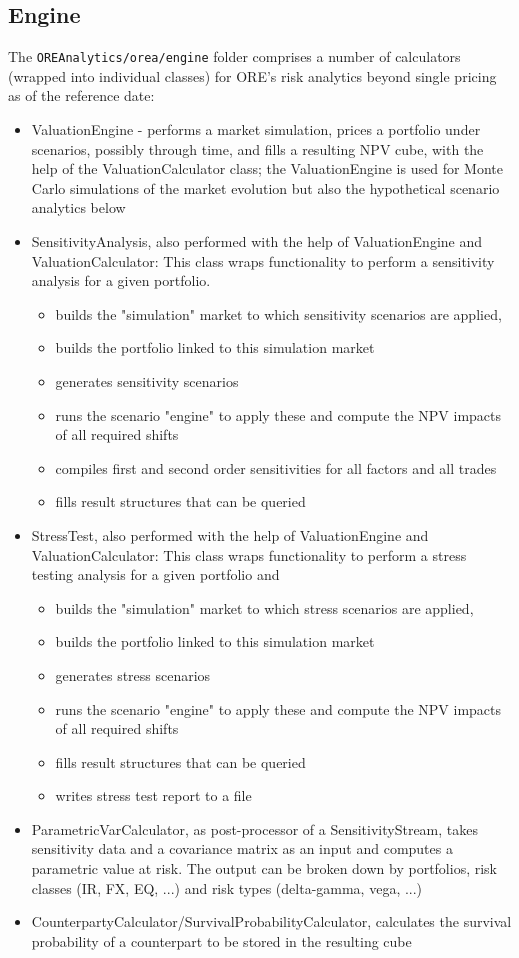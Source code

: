 \documentclass[12pt, a4paper]{article}
\begin{document}
\subsection{Engine}
The {\tt OREAnalytics/orea/engine} folder comprises a number of calculators (wrapped into individual classes) for ORE's risk analytics beyond single pricing as of the reference date:
\begin{itemize}
\item ValuationEngine - performs a market simulation, prices a portfolio under scenarios, possibly through time, and fills a resulting NPV cube, with the help of the ValuationCalculator class; the ValuationEngine is used for Monte Carlo simulations of the market evolution but also the hypothetical scenario analytics below
\item SensitivityAnalysis, also performed with the help of ValuationEngine and ValuationCalculator: This class wraps functionality to perform a sensitivity analysis for a given portfolio.
\begin{itemize}
\item builds the "simulation" market to which sensitivity scenarios are applied, 
\item builds the portfolio linked to this simulation market
\item generates sensitivity scenarios
\item runs the scenario "engine" to apply these and compute the NPV impacts of all required shifts
\item compiles first and second order sensitivities for all factors and all trades
\item fills result structures that can be queried
\end{itemize}
\item StressTest, also performed with the help of ValuationEngine and ValuationCalculator: This class wraps functionality to perform a stress testing analysis for a given portfolio and
\begin{itemize}
\item builds the "simulation" market to which stress scenarios are applied, 
\item builds the portfolio linked to this simulation market
\item generates stress scenarios
\item runs the scenario "engine" to apply these and compute the NPV impacts of all required shifts
\item fills result structures that can be queried
\item writes stress test report to a file
\end{itemize}
\item ParametricVarCalculator, as post-processor of a SensitivityStream, takes sensitivity data and a covariance matrix as an input and computes a parametric value at risk. The output can be broken down by portfolios, risk classes (IR, FX, EQ, ...) and risk types (delta-gamma, vega, ...)
\item CounterpartyCalculator/SurvivalProbabilityCalculator, calculates the survival probability of a counterpart to be stored in the resulting cube
\end{itemize}
\end{document}
